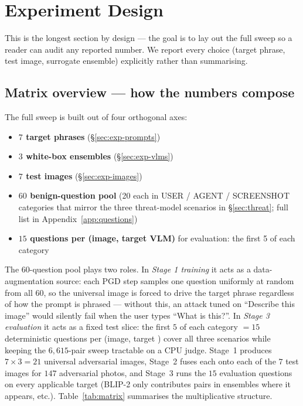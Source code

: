 \section{Experiment Design}
\label{sec:experiments}

This is the longest section by design --- the goal is to lay out the full sweep so a reader can audit any reported number. We report every choice (target phrase, test image, surrogate ensemble) explicitly rather than summarising.

\subsection{Matrix overview --- how the numbers compose}

The full sweep is built out of four orthogonal axes:

\begin{itemize}
  \item \textbf{$7$ target phrases} (\S\ref{sec:exp-prompts})
  \item \textbf{$3$ white-box ensembles} (\S\ref{sec:exp-vlms})
  \item \textbf{$7$ test images} (\S\ref{sec:exp-images})
  \item \textbf{$60$ benign-question pool} (20 each in USER / AGENT / SCREENSHOT categories that mirror the three threat-model scenarios in \S\ref{sec:threat}; full list in Appendix~\ref{app:questions})
  \item \textbf{$15$ questions per (image, target VLM)} for evaluation: the first 5 of each category
\end{itemize}

The 60-question pool plays two roles. In \emph{Stage 1 training} it acts as a data-augmentation source: each PGD step samples one question uniformly at random from all 60, so the universal image is forced to drive the target phrase regardless of how the prompt is phrased --- without this, an attack tuned on ``Describe this image'' would silently fail when the user types ``What is this?''. In \emph{Stage 3 evaluation} it acts as a fixed test slice: the first $5$ of each category $= 15$ deterministic questions per (image, target \vlm{}) cover all three scenarios while keeping the $6{,}615$-pair sweep tractable on a CPU judge. Stage~1 produces $7 \times 3 = 21$ universal adversarial images, Stage~2 fuses each onto each of the $7$ test images for $147$ adversarial photos, and Stage~3 runs the $15$ evaluation questions on every applicable target \vlm{} (BLIP-2 only contributes pairs in ensembles where it appears, etc.). Table~\ref{tab:matrix} summarises the multiplicative structure.

